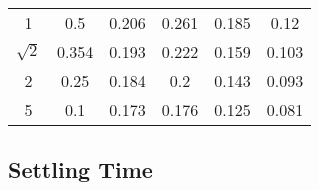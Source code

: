 \documentclass{article}[11pt]
\begin{document}
\begin{table}[H]
\begin{tabular}{cccccc}
1                        & 0.5                       & 0.206                            & 0.261                                                                  & 0.185                                                                  & 0.12                                                                   \\ 
$\sqrt{2}$               & 0.354                     & 0.193                            & 0.222                                                                  & 0.159                                                                  & 0.103                                                                  \\ 
2                        & 0.25                      & 0.184                            & 0.2                                                                    & 0.143                                                                  & 0.093                                                                  \\ 
5                        & 0.1                       & 0.173                            & 0.176                                                                  & 0.125                                                                  & 0.081                                                                  \\ \toprule
\end{tabular}
\label{tab:char-td-tr}
\end{table}

\subsection{Settling Time}
\end{document}
